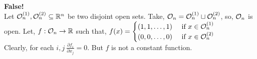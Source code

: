 \begin{soln}{9}
   \textbf{False!} \\ 
   Let $ \mathcal{O}_n^{(1)}, \mathcal{O}_n^{(2)} \subseteq \mathbb{R}^n $ be two disjoint open sets. Take, $ \mathcal{O}_n = \mathcal{O}_n^{(1)}\sqcup\mathcal{O}_n^{(2)} $, so, $ \mathcal{O}_n $ is open. Let, $ f:\mathcal{O}_n \to \mathbb{R} $ such that, $ f(x) = \begin{cases}
      (1,1,\ldots,1) & \text{ if } x \in \mathcal{O}_n^{(1)} \\ 
      (0,0,\ldots,0) & \text{ if } x \in \mathcal{O}_n^{(2)}
     \end{cases} $ \\ 
     Clearly, for each $ i,j \ \frac{\partial f_i}{\partial x_j} = 0 $. But $ f $ is not a constant function.
\end{soln}